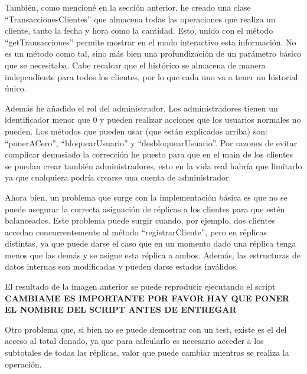 \documentclass{article}
\begin{document}
También, como mencioné en la sección anterior, he creado una clase ``TransaccionesClientes'' que almacena todas las operaciones que realiza un cliente, tanto la fecha y hora como la cantidad. Esto, unido con el método ``getTransacciones'' permite mostrar en el modo interactivo esta información. No es un método como tal, sino más bien una profundización de un parámetro básico que se necesitaba. Cabe recalcar que el histórico se almacena de manera independiente para todos los clientes, por lo que cada uno va a tener un historial único.

Además he añadido el rol del administrador. Los administradores tienen un identificador menor que 0 y pueden realizar acciones que los usuarios normales no pueden. Los métodos que pueden usar (que están explicados arriba) son: ``ponerACero'', ``bloquearUsuario'' y ``desbloquearUsuario''. Por razones de evitar complicar demasiado la corrección he puesto para que en el main de los clientes se puedan crear también administradores, esto en la vida real habría que limitarlo ya que cualquiera podría crearse una cuenta de administrador.






Ahora bien, un problema que surge con la implementación básica es que no se puede asegurar la correcta asignación de réplicas a los clientes para que estén balanceados. Este problema puede surgir cuando, por ejemplo, dos clientes accedan concurrentemente al método ``registrarCliente'', pero en réplicas distintas, ya que puede darse el caso que en un momento dado una réplica tenga menos que las demás y se asigne esta réplica a ambos. Además, las estructuras de datos internas son modificadas y pueden darse estados inválidos.


El resultado de la imagen anterior se puede reproducir ejecutando el script \textbf{CAMBIAME ES IMPORTANTE POR FAVOR HAY QUE PONER EL NOMBRE DEL SCRIPT ANTES DE ENTREGAR}

Otro problema que, si bien no se puede demostrar con un test, existe es el del acceso al total donado, ya que para calcularlo es necesario acceder a los subtotales de todas las réplicas, valor que puede cambiar mientras se realiza la operación.
\end{document}
